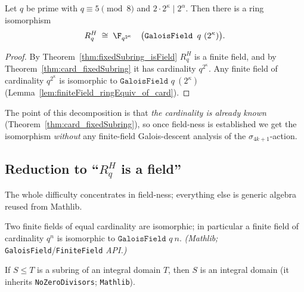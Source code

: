 \begin{theorem}\label{thm:fixedSubring_equiv_galoisField}
Let $q$ be prime with $q \equiv 5 \pmod 8$ and $2 \cdot 2^\kappa \mid 2^\alpha$. Then there is a
ring isomorphism
\[
  R_q^{H} \;\cong\; \F_{q^{2^\kappa}} \quad\bigl(\texttt{GaloisField } q\ (2^\kappa)\bigr).
\]
\end{theorem}

\begin{proof}
By Theorem~\ref{thm:fixedSubring_isField} $R_q^H$ is a finite field, and by
Theorem~\ref{thm:card_fixedSubring} it has cardinality $q^{2^\kappa}$. Any finite field of
cardinality $q^{2^\kappa}$ is isomorphic to $\texttt{GaloisField } q\ (2^\kappa)$
(Lemma~\ref{lem:finiteField_ringEquiv_of_card}).
\end{proof}

\noindent
The point of this decomposition is that \emph{the cardinality is already known}
(Theorem~\ref{thm:card_fixedSubring}), so once field-ness is established we get the isomorphism
\emph{without} any finite-field Galois-descent analysis of the $\sigma_{4k+1}$-action.

\subsection{Reduction to ``$R_q^H$ is a field''}

The whole difficulty concentrates in field-ness; everything else is generic algebra reused from
Mathlib.

\begin{lemma}\label{lem:finiteField_ringEquiv_of_card}
Two finite fields of equal cardinality are isomorphic; in particular a finite field of
cardinality $q^{n}$ is isomorphic to $\texttt{GaloisField } q\ n$. \emph{(Mathlib;}
\texttt{GaloisField}/\texttt{FiniteField} \emph{API.)}
\end{lemma}

\begin{lemma}\label{lem:subring_isDomain}
If $S \le T$ is a subring of an integral domain $T$, then $S$ is an integral domain
(it inherits \texttt{NoZeroDivisors}; \texttt{Mathlib}).
\end{lemma}

